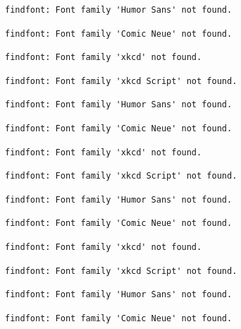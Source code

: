 \documentclass[
  letterpaper,
  DIV=11,
  numbers=noendperiod]{scrartcl}
\begin{document}
\begin{verbatim}
findfont: Font family 'Humor Sans' not found.
\end{verbatim}

\begin{verbatim}
findfont: Font family 'Comic Neue' not found.
\end{verbatim}

\begin{verbatim}
findfont: Font family 'xkcd' not found.
\end{verbatim}

\begin{verbatim}
findfont: Font family 'xkcd Script' not found.
\end{verbatim}

\begin{verbatim}
findfont: Font family 'Humor Sans' not found.
\end{verbatim}

\begin{verbatim}
findfont: Font family 'Comic Neue' not found.
\end{verbatim}

\begin{verbatim}
findfont: Font family 'xkcd' not found.
\end{verbatim}

\begin{verbatim}
findfont: Font family 'xkcd Script' not found.
\end{verbatim}

\begin{verbatim}
findfont: Font family 'Humor Sans' not found.
\end{verbatim}

\begin{verbatim}
findfont: Font family 'Comic Neue' not found.
\end{verbatim}

\begin{verbatim}
findfont: Font family 'xkcd' not found.
\end{verbatim}

\begin{verbatim}
findfont: Font family 'xkcd Script' not found.
\end{verbatim}

\begin{verbatim}
findfont: Font family 'Humor Sans' not found.
\end{verbatim}

\begin{verbatim}
findfont: Font family 'Comic Neue' not found.
\end{verbatim}
\end{document}
